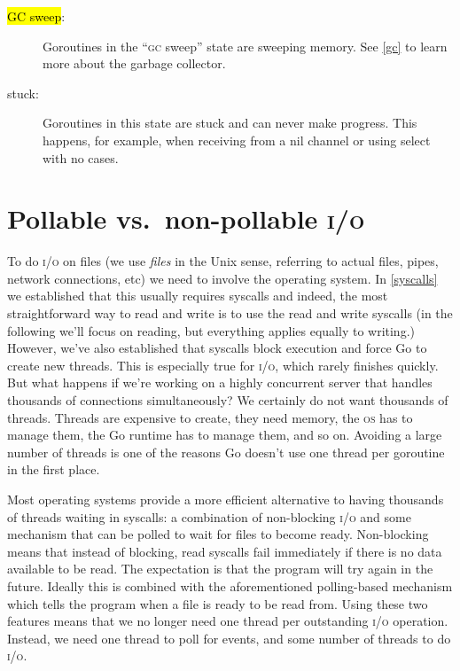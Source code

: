 \documentclass[10pt,letterpaper,oneside,openany,english]{memoir}
\newcommand{\code}[1]{{\ttfamily\mbox{#1}}}
\newcommand{\traceState}[2]{{\sethlcolor{#2}\hl{#1}}}
\begin{document}
\begin{description}
\item[\traceState{GC sweep}{stateGC}:] Goroutines in the \enquote{\textsc{gc} sweep} state are sweeping memory.
  See \cref{gc} to learn more about the garbage collector.

\item[stuck:] Goroutines in this state are stuck and can never make progress.
  This happens, for example, when receiving from a nil channel or using \code{select} with no cases.

\end{description}

\section{Pollable vs.\ non-pollable \textsc{i/o}}\label{netpoller}

To do \textsc{i/o} on files (we use \emph{files} in the Unix sense, referring to actual files, pipes, network connections, etc) we need to involve the operating system.
In \cref{syscalls} we established that this usually requires syscalls and indeed, the most straightforward way to read and write is to use the \code{read} and \code{write} syscalls (in the following we'll focus on reading, but everything applies equally to writing.)
However, we've also established that syscalls block execution and force Go to create new threads.
This is especially true for \textsc{i/o}, which rarely finishes quickly.
But what happens if we're working on a highly concurrent server that handles thousands of connections simultaneously?
We certainly do not want thousands of threads.
Threads are expensive to create, they need memory, the \textsc{os} has to manage them, the Go runtime has to manage them, and so on.
Avoiding a large number of threads is one of the reasons Go doesn't use one thread per goroutine in the first place.

Most operating systems provide a more efficient alternative to having thousands of threads waiting in syscalls:
a combination of non-blocking \textsc{i/o} and some mechanism that can be polled to wait for files to become ready.
Non-blocking means that instead of blocking, read syscalls fail immediately if there is no data available to be read.
The expectation is that the program will try again in the future.
Ideally this is combined with the aforementioned polling-based mechanism which tells the program when a file is ready to be read from.
Using these two features means that we no longer need one thread per outstanding \textsc{i/o} operation. Instead, we need one thread to poll for events, and some number of threads to do \textsc{i/o}.
\end{document}
